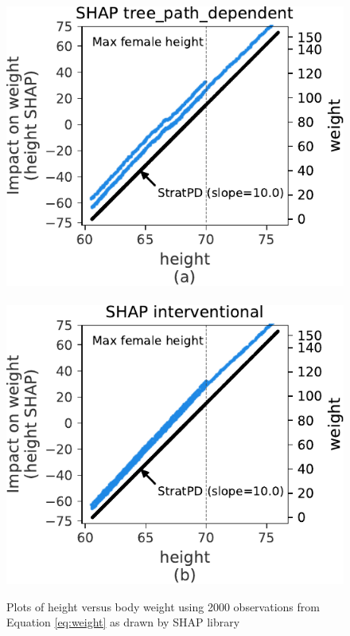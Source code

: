 \documentclass[11pt]{article}
\newcommand{\todo}[1]{{{\color{red}{[#1]}}}}
\begin{document}
\todo{maybe we move the two partial dependence items in the bullet list to the partial dependence paper and reference them here?}

\begin{figure}[htbp]
\begin{center}
\includegraphics[scale=0.5]{images/weight-shap-tree_path_dependent.pdf}~~
\includegraphics[scale=0.5]{images/weight-shap-interventional.pdf}
\caption{\small Plots of height versus body weight using 2000 observations from Equation \eqref{eq:weight} as drawn by SHAP library}
\label{fig:shap-weight}
\end{center}
\end{figure}
\end{document}
